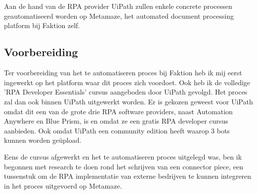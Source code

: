 
\chapter{}
\label{ch:methodologie}



Aan de hand van de RPA provider UiPath zullen enkele concrete processen geautomatiseerd worden op Metamaze, het automated document processing platform bij Faktion zelf.


\section{Voorbereiding}
Ter voorbereiding van het te automatiseren proces bij Faktion heb ik mij eerst ingewerkt op het platform waar dit proces zich voordoet. Ook heb ik de volledige 'RPA Developer Essentials' cursus aangeboden door UiPath gevolgd. Het proces zal dan ook binnen UiPath uitgewerkt worden. Er is gekozen geweest voor UiPath omdat dit een van de grote drie RPA software providers, naast Automation Anywhere en Blue Prism, is en omdat ze een gratis RPA developer cursus aanbieden. Ook omdat UiPath een community edition heeft waarop 3 bots kunnen worden geüpload.

Eens de cursus afgewerkt en het te automatiseren proces uitgelegd was, ben ik begonnen met research te doen rond het schrijven van een connector piece, een tussenstuk om de RPA implementatie van externe bedrijven te kunnen integreren in het proces uitgevoerd op Metamaze.

